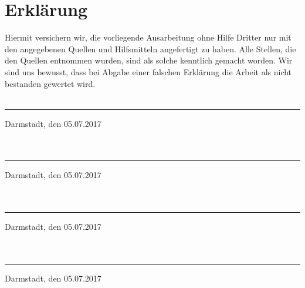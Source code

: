 \section*{Erklärung}

Hiermit versichern wir, die vorliegende Ausarbeitung ohne Hilfe Dritter nur mit den angegebenen Quellen und Hilfsmitteln angefertigt zu haben. Alle Stellen, die den Quellen entnommen wurden, sind als solche kenntlich gemacht worden. Wir sind uns bewusst, dass bei Abgabe einer falschen Erklärung die Arbeit als nicht bestanden gewertet wird. \\ \\

\rule{5cm}{.4pt}\par
Darmstadt, den 05.07.2017\\ \\  \\

\rule{5cm}{.4pt}\par
Darmstadt, den 05.07.2017 \\ \\ \\

\rule{5cm}{.4pt}\par
Darmstadt, den 05.07.2017\\ \\ \\

\rule{5cm}{.4pt}\par
Darmstadt, den 05.07.2017

%
%
%



